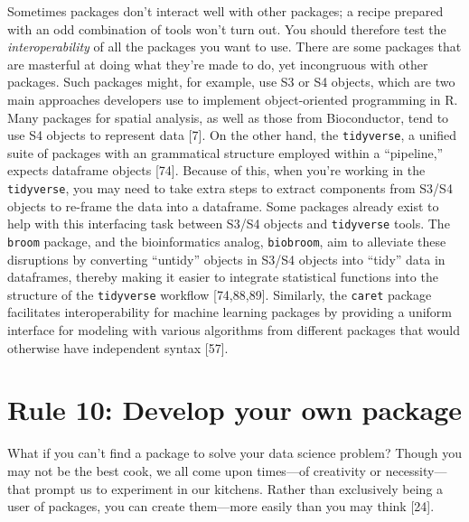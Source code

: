 \documentclass[10pt,letterpaper]{article}
\begin{document}
Sometimes packages don't interact well with other packages; a recipe
prepared with an odd combination of tools won't turn out. You should
therefore test the \emph{interoperability} of all the packages you want
to use. There are some packages that are masterful at doing what they're
made to do, yet incongruous with other packages. Such packages might,
for example, use S3 or S4 objects, which are two main approaches
developers use to implement object-oriented programming in R. Many
packages for spatial analysis, as well as those from Bioconductor, tend
to use S4 objects to represent data {[}7{]}. On the other hand, the
\texttt{tidyverse}, a unified suite of packages with an grammatical
structure employed within a ``pipeline,'' expects dataframe objects
{[}74{]}. Because of this, when you're working in the
\texttt{tidyverse}, you may need to take extra steps to extract
components from S3/S4 objects to re-frame the data into a dataframe.
Some packages already exist to help with this interfacing task between
S3/S4 objects and \texttt{tidyverse} tools. The \texttt{broom} package,
and the bioinformatics analog, \texttt{biobroom}, aim to alleviate these
disruptions by converting ``untidy'' objects in S3/S4 objects into
``tidy'' data in dataframes, thereby making it easier to integrate
statistical functions into the structure of the \texttt{tidyverse}
workflow {[}74,88,89{]}. Similarly, the \texttt{caret} package
facilitates interoperability for machine learning packages by providing
a uniform interface for modeling with various algorithms from different
packages that would otherwise have independent syntax {[}57{]}.

\hypertarget{rule-10-develop-your-own-package}{%
\section{Rule 10: Develop your own
package}\label{rule-10-develop-your-own-package}}

What if you can't find a package to solve your data science problem?
Though you may not be the best cook, we all come upon times---of
creativity or necessity---that prompt us to experiment in our kitchens.
Rather than exclusively being a user of packages, you can create
them---more easily than you may think {[}24{]}.
\end{document}
